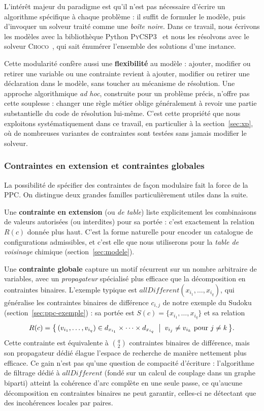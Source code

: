 \documentclass[11pt,a4paper]{article}
\begin{document}
L'intérêt majeur du paradigme est qu'il n'est pas nécessaire d'écrire
un algorithme spécifique à chaque problème : il suffit de formuler le
modèle, puis d'invoquer un solveur traité comme une \emph{boîte
noire}. Dans ce travail, nous écrivons les modèles avec la
bibliothèque Python \textsc{PyCSP3}~\cite{pycsp3ace} et nous les
résolvons avec le solveur \textsc{Choco}~\cite{choco}, qui sait
énumérer l'ensemble des solutions d'une instance.

Cette modularité confère aussi une \textbf{flexibilité} au
modèle : ajouter, modifier ou retirer une variable ou une contrainte
revient à ajouter, modifier ou retirer une déclaration dans le modèle,
sans toucher au mécanisme de résolution. Une approche algorithmique
\emph{ad hoc}, construite pour un problème précis, n'offre pas cette
souplesse : changer une règle métier oblige généralement à revoir une
partie substantielle du code de résolution lui-même. C'est cette
propriété que nous exploitons systématiquement dans ce travail, en
particulier à la section~\ref{sec:xp}, où de nombreuses variantes de
contraintes sont testées sans jamais modifier le solveur.

\subsubsection{Contraintes en extension et contraintes globales}
\label{sec:ppc-globales}

La possibilité de spécifier des contraintes de façon modulaire fait la
force de la PPC. On distingue deux grandes familles particulièrement
utiles dans la suite.

Une \textbf{contrainte en extension} (ou \emph{de table}) liste
explicitement les combinaisons de valeurs autorisées (ou interdites)
pour sa portée : c'est exactement la relation $R(c)$ donnée plus haut.
C'est la forme naturelle pour encoder un catalogue de configurations
admissibles, et c'est elle que nous utiliserons pour la \emph{table de
voisinage} chimique (section~\ref{sec:modele}).

Une \textbf{contrainte globale} capture un motif récurrent sur un
nombre arbitraire de variables, avec un \emph{propagateur} spécialisé
plus efficace que la décomposition en contraintes binaires. L'exemple
typique est $\mathit{allDifferent}(x_{i_1}, \dots, x_{i_q})$,
qui généralise les contraintes binaires de différence $c_{i,j}$
de notre exemple du Sudoku (section~\ref{sec:ppc-exemple}) : sa
portée est $S(c) = \{x_{i_1}, \dots, x_{i_q}\}$ et sa relation
\[
  R(c) = \bigl\{\, (v_{i_1}, \dots, v_{i_q}) \in d_{x_{i_1}} \times
    \dots \times d_{x_{i_q}} \;\bigm|\; v_{i_j} \ne v_{i_k}
    \text{ pour } j \ne k \,\bigr\}.
\]
Cette contrainte est équivalente à $\binom{q}{2}$ contraintes binaires
de différence, mais son propagateur dédié élague l'espace de recherche
de manière nettement plus efficace. Ce gain n'est pas qu'une question
de compacité d'écriture : l'algorithme de filtrage dédié à
$\mathit{allDifferent}$ (fondé sur un calcul de couplage dans un graphe
biparti) atteint la cohérence d'arc complète en une seule passe, ce
qu'aucune décomposition en contraintes binaires ne peut garantir,
celles-ci ne détectant que des incohérences locales par paires.
\end{document}
